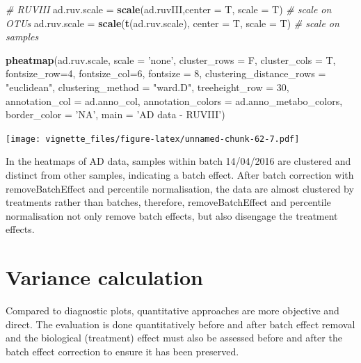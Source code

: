 \documentclass[]{book}
\newenvironment{Shaded}{\begin{snugshade}}{\end{snugshade}}
\newcommand{\KeywordTok}[1]{\textcolor[rgb]{0.13,0.29,0.53}{\textbf{#1}}}
\newcommand{\DataTypeTok}[1]{\textcolor[rgb]{0.13,0.29,0.53}{#1}}
\newcommand{\DecValTok}[1]{\textcolor[rgb]{0.00,0.00,0.81}{#1}}
\newcommand{\StringTok}[1]{\textcolor[rgb]{0.31,0.60,0.02}{#1}}
\newcommand{\CommentTok}[1]{\textcolor[rgb]{0.56,0.35,0.01}{\textit{#1}}}
\newcommand{\NormalTok}[1]{#1}
\begin{document}
\begin{Shaded}
\begin{Highlighting}[]
\CommentTok{# RUVIII}
\NormalTok{ad.ruv.scale =}\StringTok{ }\KeywordTok{scale}\NormalTok{(ad.ruvIII,}\DataTypeTok{center =}\NormalTok{ T, }\DataTypeTok{scale =}\NormalTok{ T) }\CommentTok{# scale on OTUs}
\NormalTok{ad.ruv.scale =}\StringTok{ }\KeywordTok{scale}\NormalTok{(}\KeywordTok{t}\NormalTok{(ad.ruv.scale), }\DataTypeTok{center =}\NormalTok{ T, }\DataTypeTok{scale =}\NormalTok{ T) }\CommentTok{# scale on samples}

\KeywordTok{pheatmap}\NormalTok{(ad.ruv.scale, }
         \DataTypeTok{scale =} \StringTok{'none'}\NormalTok{, }
         \DataTypeTok{cluster_rows =}\NormalTok{ F, }
         \DataTypeTok{cluster_cols =}\NormalTok{ T, }
         \DataTypeTok{fontsize_row=}\DecValTok{4}\NormalTok{, }\DataTypeTok{fontsize_col=}\DecValTok{6}\NormalTok{,}
         \DataTypeTok{fontsize =} \DecValTok{8}\NormalTok{,}
         \DataTypeTok{clustering_distance_rows =} \StringTok{"euclidean"}\NormalTok{,}
         \DataTypeTok{clustering_method =} \StringTok{"ward.D"}\NormalTok{,}
         \DataTypeTok{treeheight_row =} \DecValTok{30}\NormalTok{,}
         \DataTypeTok{annotation_col =}\NormalTok{ ad.anno_col,}
         \DataTypeTok{annotation_colors =}\NormalTok{ ad.anno_metabo_colors,}
         \DataTypeTok{border_color =} \StringTok{'NA'}\NormalTok{,}
         \DataTypeTok{main =} \StringTok{'AD data - RUVIII'}\NormalTok{)}
\end{Highlighting}
\end{Shaded}

\texttt{[image: vignette\_files/figure-latex/unnamed-chunk-62-7.pdf]}

In the heatmaps of AD data, samples within batch 14/04/2016 are
clustered and distinct from other samples, indicating a batch effect.
After batch correction with removeBatchEffect and percentile
normalisation, the data are almost clustered by treatments rather than
batches, therefore, removeBatchEffect and percentile normalisation not
only remove batch effects, but also disengage the treatment effects.

\section{Variance calculation}\label{variance-calculation}

Compared to diagnostic plots, quantitative approaches are more objective
and direct. The evaluation is done quantitatively before and after batch
effect removal and the biological (treatment) effect must also be
assessed before and after the batch effect correction to ensure it has
been preserved.
\end{document}
